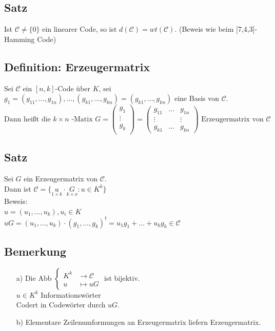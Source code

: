 \subsection{Satz}
Ist $\mathcal{C} \neq \lbrace 0 \rbrace$ ein linearer Code, so ist $d(\mathcal{C})=wt(\mathcal{C})$. (Beweis wie beim [7,4,3]-Hamming Code)

\subsection{Definition: Erzeugermatrix} %
Sei $\mathcal{C}$ ein $[n,k]$-Code \"uber $K$, sei $g_1=(g_{11},\ldots,g_{1n}),\ldots,(g_{k1},\ldots,g_{kn})=(g_{k1},\ldots,g_{kn})$ eine Basis von $\mathcal{C}$.
\[
\text{Dann hei\ss t die } k\times n\text{ -Matix } G=
\begin{pmatrix}
g_1\\
\vdots \\
g_k\\
\end{pmatrix}
=
\begin{pmatrix}
	g_{11}&\ldots&g_{1n}\\
	\vdots&&\vdots\\
	g_{k1}&\ldots&g_{kn}
\end{pmatrix}
\text{ Erzeugermatrix von } \mathcal{C}
\]
\subsection{Satz}
Sei $G$ ein Erzeugermatrix von $\mathcal{C}$.\\
Dann ist $\mathcal{C} = \lbrace \underset{1\times k}{u} \cdot \underset{k\times x}{G}: u \in K^k \rbrace$\\
Beweis:\\
$u=(u_1,\ldots,u_k),u_i\in K$\\
$uG=(u_1,\ldots,u_k) \cdot (g_1,\ldots,g_k)^t=u_1g_1+\ldots + u_kg_k \in \mathcal{C}$\\
\subsection{Bemerkung}
\begin{itemize}
	\item[a)] Die Abb 
	$\begin{cases}
		K^k & \rightarrow \mathcal{C}\\
		u & \mapsto uG
	\end{cases}$ ist bijektiv. \\
	$u \in K^k$ Informationsw\"orter \\
	Codert in Codew\"orter durch $uG$.
	\item[b)] Elementare Zeilenumformungen an Erzeugermatrix liefern Erzeugermatrix.
\end{itemize}
